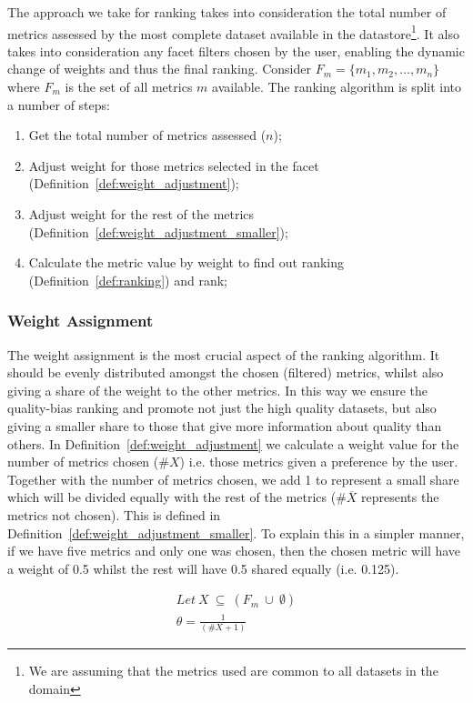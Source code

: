 The approach we take for ranking takes into consideration the total number of metrics assessed by the most complete dataset available in the datastore\footnote{We are assuming that the metrics used are common to all datasets in the domain}.
It also takes into consideration any facet filters chosen by the user, enabling the dynamic change of weights and thus the final ranking.
Consider $F_{m} = \lbrace m_{1},m_{2},\dots,m_{n} \rbrace$ where $F_{m}$ is the set of all metrics $m$ available.
The ranking algorithm is split into a number of steps:
\begin{enumerate}
\item Get the total number of metrics assessed ($n$);
\item Adjust weight for those metrics selected in the facet (Definition~\ref{def:weight_adjustment});
\item Adjust weight for the rest of the metrics (Definition~\ref{def:weight_adjustment_smaller});
\item Calculate the metric value by weight to find out ranking (Definition~\ref{def:ranking}) and rank;
\end{enumerate}

\subsubsection{Weight Assignment}
The weight assignment is the most crucial aspect of the ranking algorithm.
It should be evenly distributed amongst the chosen (filtered) metrics, whilst also giving a share of the weight to the other metrics.
In this way we ensure the quality-bias ranking and promote not just the high quality datasets, but also giving a smaller share to those that give more information about quality than others.
In Definition~\ref{def:weight_adjustment} we calculate a weight value for the number of metrics chosen ($\#X$) i.e. those metrics given a preference by the user.
Together with the number of metrics chosen, we add 1 to represent a small share which will be divided equally with the rest of the metrics ($\#\overline{X}$ represents the metrics not chosen).
This is defined in Definition~\ref{def:weight_adjustment_smaller}.
To explain this in a simpler manner, if we have five metrics and only one was chosen, then the chosen metric will have a weight of 0.5 whilst the rest will have 0.5 shared equally (i.e. 0.125).

\begin{Def1}
\label{def:weight_adjustment}
\begin{align*}
Let~X~\subseteq~(F_{m}~\cup~\emptyset) \\
\theta = \frac{1}{(\#X + 1)}
\end{align*}
\end{Def1}

